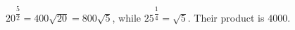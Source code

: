 $20^{\dfrac{5}{2}}=400\sqrt{20}=800\sqrt5$, while $25^{\dfrac{1}{4}}=\sqrt5$. Their product is $\boxed{4000}$.
